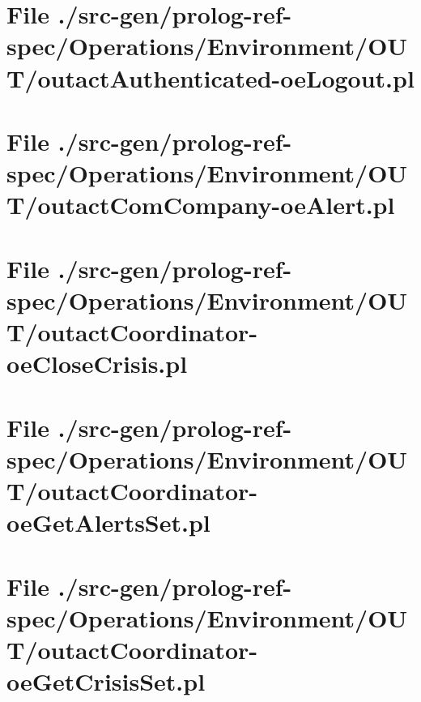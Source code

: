 \section[File /src-gen/prolog-ref-spec/Operations.../outactAuthenticated-oeLogout.pl]{File ./src-gen/prolog-ref-spec/Operations/Environment/OUT/outactAuthenticated-oeLogout.pl}
\scriptsize

\normalsize
	
\section[File /src-gen/prolog-ref-spec/Operations.../outactComCompany-oeAlert.pl]{File ./src-gen/prolog-ref-spec/Operations/Environment/OUT/outactComCompany-oeAlert.pl}
\scriptsize

\normalsize
	
\section[File /src-gen/prolog-ref-spec/Operations.../outactCoordinator-oeCloseCrisis.pl]{File ./src-gen/prolog-ref-spec/Operations/Environment/OUT/outactCoordinator-oeCloseCrisis.pl}
\scriptsize

\normalsize
	
\section[File /src-gen/prolog-ref-spec/Operations.../outactCoordinator-oeGetAlertsSet.pl]{File ./src-gen/prolog-ref-spec/Operations/Environment/OUT/outactCoordinator-oeGetAlertsSet.pl}
\scriptsize

\normalsize
	
\section[File /src-gen/prolog-ref-spec/Operations.../outactCoordinator-oeGetCrisisSet.pl]{File ./src-gen/prolog-ref-spec/Operations/Environment/OUT/outactCoordinator-oeGetCrisisSet.pl}
\scriptsize

\normalsize
	
